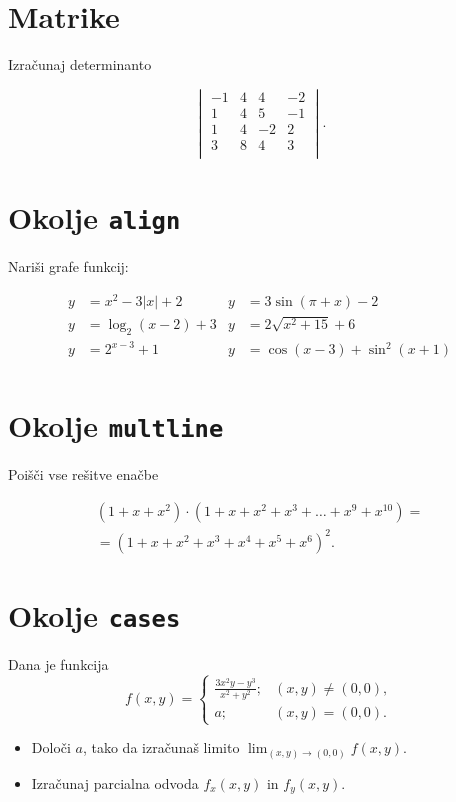\documentclass[a4paper,12pt]{article}
\begin{document}
\section*{Matrike}
Izračunaj determinanto

\[\begin{vmatrix}
    -1 & 4 & 4 & -2 \\
    1 & 4 & 5 & -1 \\
    1 & 4 & -2 & 2 \\
    3 & 8 & 4 & 3 \\
\end{vmatrix}.\]
   

\section*{Okolje \texttt{align}}
Nariši grafe funkcij:

\begin{align*}
 y &= x^2 - 3|x| + 2  &  y &= 3 \sin(\pi+x) - 2 \\
 y &= \log_2(x-2) + 3 &  y &= 2 \sqrt{x^2+15} + 6 \\
 y &= 2^{x-3} + 1     &  y &= \cos(x-3) + \sin^2(x+1) \\
\end{align*}


\section*{Okolje \texttt{multline}}
Poišči vse rešitve enačbe

\begin{multline*}
   (1+x+x^2) \cdot (1+x+x^2+x^3+\ldots+x^9+x^{10}) = \\
   =(1+x+x^2+x^3+x^4+x^5+x^6)^2. 
\end{multline*}


\section*{Okolje \texttt{cases}}
Dana je funkcija
\[
 f(x,y)=
 \begin{cases}
    \frac{3x^2y-y^3}{x^2+y^2}; & (x,y)\neq(0,0), \\
   a; & (x,y)= (0,0).
 \end{cases}
\]


\begin{itemize}
\item Določi \(a\), tako da izračunaš limito \( \lim_{(x,y)\to(0,0)} f(x,y) \).
\item Izračunaj parcialna odvoda \(f_x(x,y)\) in \(f_y(x,y)\).
\end{itemize}
\end{document}
